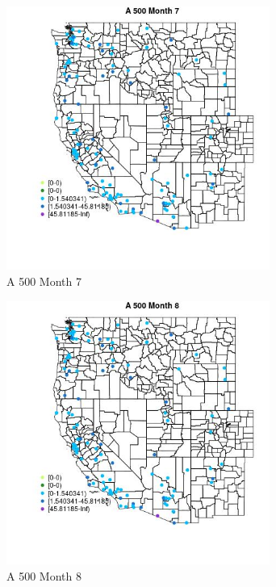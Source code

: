 \begin{figure} 
\centering  
\includegraphics[width=0.77\textwidth]{Code_Outputs/Report_ML_input_PM25_Step4_part_e_de_duplicated_aves_MapObsMo7A_500.jpg} 
\caption{\label{fig:Report_ML_input_PM25_Step4_part_e_de_duplicated_avesMapObsMo7A_500}A 500 Month 7} 
\end{figure} 
 

\begin{figure} 
\centering  
\includegraphics[width=0.77\textwidth]{Code_Outputs/Report_ML_input_PM25_Step4_part_e_de_duplicated_aves_MapObsMo8A_500.jpg} 
\caption{\label{fig:Report_ML_input_PM25_Step4_part_e_de_duplicated_avesMapObsMo8A_500}A 500 Month 8} 
\end{figure} 
 

